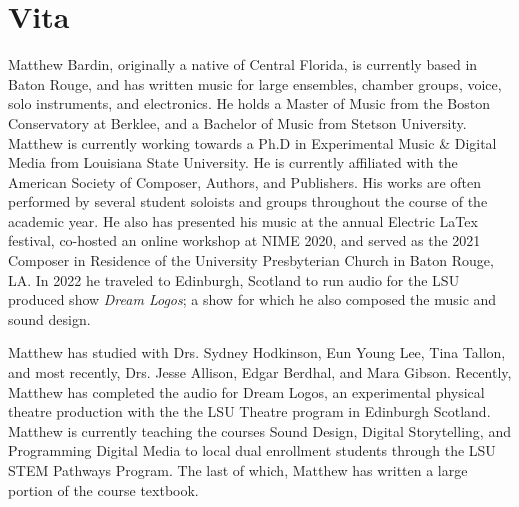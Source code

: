 \chapter{Vita}

Matthew Bardin, originally a native of Central Florida, is currently based in Baton Rouge, and has written music for large ensembles, chamber groups, voice, solo instruments, and electronics. He holds a Master of Music from the Boston Conservatory at Berklee, and a  Bachelor of Music from Stetson University. Matthew is currently working towards a Ph.D in Experimental Music \& Digital Media from Louisiana State University. He is currently affiliated with the American Society of Composer, Authors, and Publishers. His works are often performed by several student soloists and groups throughout the course of the academic year. He also has presented his music at the annual Electric LaTex festival, co-hosted an online workshop at NIME 2020, and served as the 2021 Composer in Residence of the University Presbyterian Church in Baton Rouge, LA. In 2022 he traveled to Edinburgh, Scotland to run audio for the LSU produced show \textit{Dream Logos}; a show for which he also composed the music and sound design.

Matthew has studied with Drs. Sydney Hodkinson, Eun Young Lee, Tina Tallon, and most recently, Drs. Jesse Allison, Edgar Berdhal, and Mara Gibson. Recently, Matthew has completed the audio for Dream Logos, an experimental physical theatre production with the the LSU Theatre program in Edinburgh Scotland. Matthew is currently teaching the courses Sound Design, Digital Storytelling, and Programming Digital Media to local dual enrollment students through the LSU STEM Pathways Program. The last of which, Matthew has written a large portion of the course textbook.


